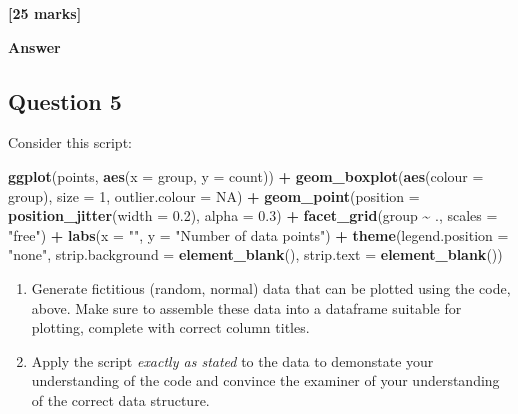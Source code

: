 \documentclass[
  10t,
]{article}
\newenvironment{Shaded}{\begin{snugshade}}{\end{snugshade}}
\newcommand{\AttributeTok}[1]{\textcolor[rgb]{0.13,0.29,0.53}{#1}}
\newcommand{\ConstantTok}[1]{\textcolor[rgb]{0.56,0.35,0.01}{#1}}
\newcommand{\DecValTok}[1]{\textcolor[rgb]{0.00,0.00,0.81}{#1}}
\newcommand{\FloatTok}[1]{\textcolor[rgb]{0.00,0.00,0.81}{#1}}
\newcommand{\FunctionTok}[1]{\textcolor[rgb]{0.13,0.29,0.53}{\textbf{#1}}}
\newcommand{\NormalTok}[1]{#1}
\newcommand{\SpecialCharTok}[1]{\textcolor[rgb]{0.81,0.36,0.00}{\textbf{#1}}}
\newcommand{\StringTok}[1]{\textcolor[rgb]{0.31,0.60,0.02}{#1}}
\providecommand{\tightlist}{%
  \setlength{\itemsep}{0pt}\setlength{\parskip}{0pt}}\usepackage{longtable,booktabs,array}
\begin{document}
\textbf{{[}25 marks{]}}

\textbf{Answer}

\subsection{Question 5}\label{question-5-1}

Consider this script:

\begin{Shaded}
\begin{Highlighting}[]
\FunctionTok{ggplot}\NormalTok{(points, }\FunctionTok{aes}\NormalTok{(}\AttributeTok{x =}\NormalTok{ group, }\AttributeTok{y =}\NormalTok{ count)) }\SpecialCharTok{+}
  \FunctionTok{geom\_boxplot}\NormalTok{(}\FunctionTok{aes}\NormalTok{(}\AttributeTok{colour =}\NormalTok{ group), }\AttributeTok{size =} \DecValTok{1}\NormalTok{, }\AttributeTok{outlier.colour =} \ConstantTok{NA}\NormalTok{) }\SpecialCharTok{+}
  \FunctionTok{geom\_point}\NormalTok{(}\AttributeTok{position =} \FunctionTok{position\_jitter}\NormalTok{(}\AttributeTok{width =} \FloatTok{0.2}\NormalTok{), }\AttributeTok{alpha =} \FloatTok{0.3}\NormalTok{) }\SpecialCharTok{+}
  \FunctionTok{facet\_grid}\NormalTok{(group }\SpecialCharTok{\textasciitilde{}}\NormalTok{ ., }\AttributeTok{scales =} \StringTok{"free"}\NormalTok{) }\SpecialCharTok{+}
  \FunctionTok{labs}\NormalTok{(}\AttributeTok{x =} \StringTok{""}\NormalTok{, }\AttributeTok{y =} \StringTok{"Number of data points"}\NormalTok{) }\SpecialCharTok{+}
  \FunctionTok{theme}\NormalTok{(}\AttributeTok{legend.position =} \StringTok{"none"}\NormalTok{,}
    \AttributeTok{strip.background =} \FunctionTok{element\_blank}\NormalTok{(),}
    \AttributeTok{strip.text =} \FunctionTok{element\_blank}\NormalTok{())}
\end{Highlighting}
\end{Shaded}

\begin{enumerate}
\def\labelenumi{\alph{enumi}.}
\tightlist
\item
  Generate fictitious (random, normal) data that can be plotted using
  the code, above. Make sure to assemble these data into a dataframe
  suitable for plotting, complete with correct column titles.
\item
  Apply the script \emph{exactly as stated} to the data to demonstate
  your understanding of the code and convince the examiner of your
  understanding of the correct data structure.
\end{enumerate}
\end{document}
